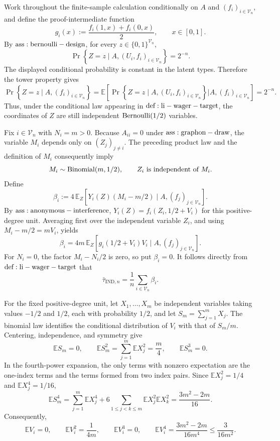 Work throughout the finite-sample calculation conditionally on \(A\) and \((f_i)_{i\in\mathcal V_n}\), and define the proof-intermediate function
\[
 g_i(x):=\frac{f_i(1,x)+f_i(0,x)}2,
 \qquad x\in[0,1].
\]
By \({\rm ass:bernoulli-design}\), for every \(z\in\{0,1\}^{\mathcal V_n}\),
\[
 \Pr\!\left\{Z=z\mid A,(U_i,f_i)_{i\in\mathcal V_n}\right\}=2^{-n}.
\]
The displayed conditional probability is constant in the latent types.  Therefore the tower property gives
\[
 \Pr\!\left\{Z=z\mid A,(f_i)_{i\in\mathcal V_n}\right\}
 =\mathbb E\!\left[
   \Pr\!\left\{Z=z\mid A,(U_i,f_i)_{i\in\mathcal V_n}\right\}
   \mathrel{\big|}A,(f_i)_{i\in\mathcal V_n}
 \right]
 =2^{-n}.
\]
Thus, under the conditional law appearing in \({\rm def:li-wager-target}\), the coordinates of \(Z\) are still independent \({\rm Bernoulli}(1/2)\) variables.

Fix \(i\in\mathcal V_n\) with \(N_i=m>0\).  Because \(A_{ii}=0\) under \({\rm ass:graphon-draw}\), the variable \(M_i\) depends only on \((Z_j)_{j\ne i}\).  The preceding product law and the definition of \(M_i\) consequently imply
\[
 M_i\sim {\rm Binomial}(m,1/2),
 \qquad Z_i\ \hbox{is independent of }M_i.
\]
Define
\[
 \beta_i:=4\,\mathbb E_Z\!\left[
 Y_i(Z)(M_i-m/2)\mid A,(f_j)_{j\in\mathcal V_n}
 \right].
\]
By \({\rm ass:anonymous-interference}\), \(Y_i(Z)=f_i(Z_i,1/2+V_i)\) for this positive-degree unit.  Averaging first over the independent variable \(Z_i\), and using \(M_i-m/2=mV_i\), yields
\[
 \beta_i
 =4m\,\mathbb E_Z\!\left[
 g_i(1/2+V_i)V_i\mid A,(f_j)_{j\in\mathcal V_n}
 \right].
\]
For \(N_i=0\), the factor \(M_i-N_i/2\) is zero, so put \(\beta_i=0\).  It follows directly from \({\rm def:li-wager-target}\) that
\[
 \bar\tau_{\mathrm{IND},n}=\frac1n\sum_{i\in\mathcal V_n}\beta_i.
\]

For the fixed positive-degree unit, let \(X_1,\ldots,X_m\) be independent variables taking values \(-1/2\) and \(1/2\), each with probability \(1/2\), and let \(S_m=\sum_{j=1}^mX_j\).  The binomial law identifies the conditional distribution of \(V_i\) with that of \(S_m/m\).  Centering, independence, and symmetry give
\[
 \mathbb E S_m=0,
 \qquad
 \mathbb E S_m^2=\sum_{j=1}^m\mathbb E X_j^2=\frac m4,
 \qquad
 \mathbb E S_m^3=0.
\]
In the fourth-power expansion, the only terms with nonzero expectation are the one-index terms and the terms formed from two index pairs.  Since \(\mathbb E X_j^2=1/4\) and \(\mathbb E X_j^4=1/16\),
\[
 \mathbb E S_m^4
 =\sum_{j=1}^m\mathbb E X_j^4
  +6\sum_{1\le j<k\le m}\mathbb E X_j^2\mathbb E X_k^2
 =\frac{3m^2-2m}{16}.
\]
Consequently,
\[
 \mathbb E V_i=0,
 \qquad
 \mathbb E V_i^2=\frac1{4m},
 \qquad
 \mathbb E V_i^3=0,
 \qquad
 \mathbb E V_i^4=\frac{3m^2-2m}{16m^4}\le\frac3{16m^2}.
\]

